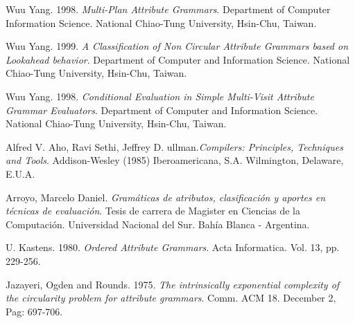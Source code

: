 \documentclass[runningheads,a4paper]{llncs}
\begin{document}

\begin{thebibliography}{10}

 Wuu Yang. 1998. \textit{Multi-Plan Attribute Grammars}. Department of Computer Information Science. National Chiao-Tung University, Hsin-Chu, Taiwan.

 Wuu Yang. 1999. \textit{A Classification of Non Circular Attribute Grammars based on Lookahead behavior}. Department of Computer and Information Science. National Chiao-Tung University, Hsin-Chu, Taiwan.

 Wuu Yang. 1998. \textit{Conditional Evaluation in Simple Multi-Visit Attribute Grammar Evaluators}. Department of Computer and Information Science. National
Chiao-Tung University, Hsin-Chu, Taiwan.




 Alfred V. Aho, Ravi Sethi, Jeffrey D. ullman.\textit{Compilers: Principles, Techniques and Tools}. Addison-Wesley (1985)  Iberoamericana, S.A. Wilmington, Delaware, E.U.A.

 Arroyo, Marcelo Daniel. \textit{Gramáticas de atributos, clasificación y aportes en técnicas de evaluación}. Tesis de carrera de Magister en Ciencias de la Computación. Universidad Nacional del Sur. Bahía Blanca - Argentina.

 U. Kastens. 1980. \textit{Ordered Attribute Grammars}. Acta Informatica. Vol. 13, pp. 229-256.

 Jazayeri, Ogden and Rounds. 1975. \emph{The intrinsically exponential complexity of the circularity problem for attribute grammars}. Comm. ACM 18. December 2, Pag: 697-706.




\end{thebibliography}
\end{document}
